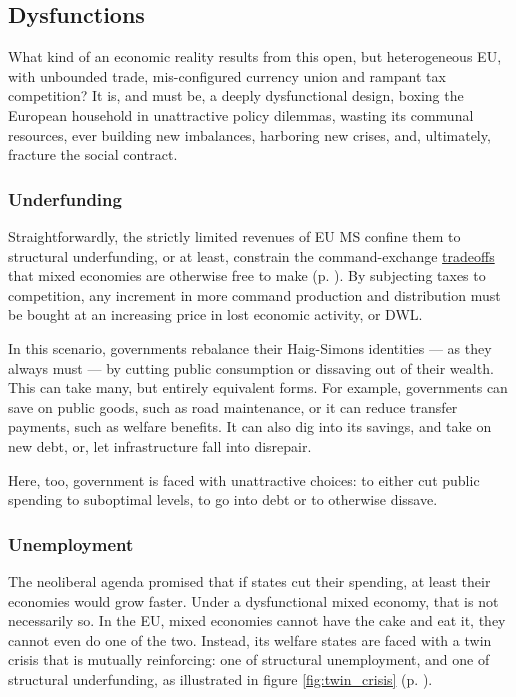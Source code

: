 \documentclass[11pt,a4paper,oneside,openright]{article}
\begin{document}
\subsection{Dysfunctions} \label{sec:defunct} What kind of an economic reality results from this open, but heterogeneous \gls{EU}, with unbounded trade, mis-configured currency union and rampant tax competition? It is, and must be, a deeply dysfunctional design, boxing the European household in unattractive policy dilemmas, wasting its communal resources, ever building new imbalances, harboring new crises, and, ultimately, fracture the social contract.

\subsubsection{Underfunding} \label{sec:public_squalor} Straightforwardly, the strictly limited revenues of \gls{EU} \gls{MS} confine them to structural underfunding, or at least, constrain the command-exchange \hyperref[sec:tradeoffs]{tradeoffs} that mixed economies are otherwise free to make (p. \pageref{sec:tradeoffs}). %
By subjecting taxes to competition, any increment in more command production and distribution must be bought at an increasing price in lost economic activity, or \gls{DWL}. 

In this scenario, governments rebalance their Haig-Simons identities --- as they always must --- by cutting public consumption or dissaving out of their wealth. This can take many, but entirely equivalent forms. For example, governments can save on public goods, such as road maintenance, or it can reduce transfer payments, such as welfare benefits. It can also dig into its savings, and take on new debt, or, let infrastructure fall into disrepair.

Here, too, government is faced with unattractive choices: to either cut public spending to suboptimal levels, to go into debt or to otherwise dissave.


\subsubsection{Unemployment}
The neoliberal agenda promised that if states cut their spending, at least their economies would grow faster. Under a dysfunctional mixed economy, that is not necessarily so. In the \gls{EU}, mixed economies cannot have the cake and eat it, they cannot even do one of the two. Instead, its welfare states are faced with a twin crisis that is mutually reinforcing: one of structural unemployment, and one of structural underfunding, as illustrated in figure \ref{fig:twin_crisis} (p. \pageref{fig:twin_crisis}). 
\end{document}
